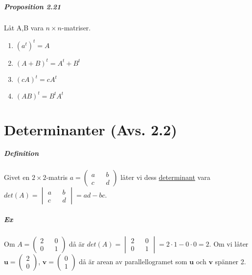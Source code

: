 \paragraph{Proposition 2.21} Låt A,B vara $n\times n$-matriser.
\begin{enumerate}
    \item $(a^{t})^{t}=A$
    \item $(A+B)^{t}=A^{t}+B^{t}$
    \item $(cA)^{t}=cA^{t}$
    \item $(AB)^{t}=B^{t}A^{t}$
\end{enumerate}

\chapter{Determinanter (Avs. 2.2)}
\paragraph{Definition} Givet en $2\times 2$-matris $a=\begin{pmatrix}a&&b\\c&&d\end{pmatrix}$ låter vi dess \underline{determinant} vara $det(A)=\begin{vmatrix}a&&b\\c&&d\end{vmatrix}=ad-bc$.

\paragraph{Ex} Om $A=\begin{pmatrix}
    2&&0\\0&&1
\end{pmatrix}$ då är $det(A)=\begin{vmatrix}
    2&&0\\0&&1
\end{vmatrix}=2\cdot 1-0\cdot 0=2$.
Om vi låter $\bm{u}=\begin{pmatrix}
    2\\0
\end{pmatrix}$, $\bm{v}=\begin{pmatrix}
    0\\1
\end{pmatrix}$ då är arean av parallellogramet som $\bm{u}$ och $\bm{v}$ spänner 2.\\

